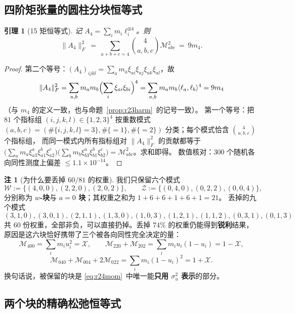 \documentclass[UTF8,11pt]{ctexart}
\newtheorem{lemma}[theorem]{引理}
\theoremstyle{definition}
\newtheorem{remark}[theorem]{注}
\begin{document}
\subsection{四阶矩张量的圆柱分块恒等式}\label{sec:r24:block}

\begin{lemma}[15 矩恒等式]\label{lem:r24mom}
记 $A_4=\sum_im_i\ell_i^{\otimes4}$。则
\begin{equation}\label{eq:r24mom}
\|A_4\|_F^2\ =\ \sum_{a+b+c=4}\binom{4}{a,b,c}\mathcal{M}_{abc}^2\ =\ 9m_4 .
\end{equation}
\end{lemma}

\begin{proof}
第二个等号：$(A_4)_{ijkl}=\sum_am_a\xi_{ai}\xi_{aj}\xi_{ak}\xi_{al}$，故
\[
\|A_4\|_F^2=\sum_{a,b}m_am_b\Bigl(\sum_i\xi_{ai}\xi_{bi}\Bigr)^4
=\sum_{a,b}m_am_b\langle\ell_a,\ell_b\rangle^4=9m_4
\]
（与 $m_4$ 的定义一致，也与命题~\ref{prop:r23harm}~的记号一致）。
第一个等号：把 $81$ 个指标组 $(i,j,k,l)\in\{1,2,3\}^4$ 按重数模式
$(a,b,c)=(\#\{i,j,k,l\}=3\},\#\{=1\},\#\{=2\})$ 分类；每个模式恰含 $\binom{4}{a,b,c}$ 个指标组，
而同一模式内所有指标组对 $\|A_4\|_F^2$ 的贡献都等于
$\bigl(\sum_am_a\xi_{a3}^a\xi_{a1}^b\xi_{a2}^c\bigr)\bigl(\sum_b m_b\xi_{b3}^a\xi_{b1}^b\xi_{b2}^c\bigr)
=\mathcal{M}_{abc}^2$。求和即得。
数值核对：$300$ 个随机各向同性测度上偏差 $\le1.1\times10^{-14}$。
\end{proof}

\begin{remark}[为什么要丢掉 $60/81$ 的权重]\label{rem:r24drop}
我们只保留六个模式
\[
\mathcal{W}:=\{(4,0,0),(2,2,0),(2,0,2)\},\qquad
\mathcal{Z}:=\{(0,4,0),(0,2,2),(0,0,4)\},
\]
分别称为 \textbf{$w$-块}与 \textbf{$a{=}0$ 块}；其权重之和为 $1+6+6+1+6+1=21$。
丢掉的九个模式
\[
(3,1,0),(3,0,1),(2,1,1),(1,3,0),(1,0,3),(1,2,1),(1,1,2),(0,3,1),(0,1,3)
\]
共 $60$ 份权重，全部非负，可以直接扔掉。丢掉 $74\%$ 的权重仍能得到\textbf{锐利}结果，
原因是这六块恰好携带了三个被各向同性完全决定的量：
\[
\mathcal{M}_{400}=\sum_im_iu_i^2=\mathcal{X},\qquad
\mathcal{M}_{220}+\mathcal{M}_{202}=\sum_im_iu_i(1-u_i)=1-\mathcal{X},
\]
\[
\mathcal{M}_{040}+\mathcal{M}_{004}+2\mathcal{M}_{022}=\sum_im_i(1-u_i)^2=1+\mathcal{X}.
\]
换句话说，被保留的块是 \eqref{eq:r24mom}~中唯一能\textbf{只用 $\sigma_u^2$ 表示}的部分。
\end{remark}

\subsection{两个块的精确松弛恒等式}\label{sec:r24:blocks}
\end{document}
